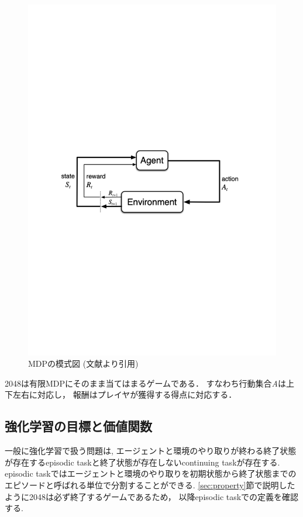 \begin{figure}[h]
  \centering
  \includegraphics[width=\linewidth{}]{figures/MDP.pdf}
  \caption{MDPの模式図 (文献\cite{Sutton1998}より引用) \label{fig:mdp}}
\end{figure}

2048は有限MDPにそのまま当てはまるゲームである．
すなわち行動集合\textit{A}は上下左右に対応し， 報酬はプレイヤが獲得する得点に対応する．

\subsection{強化学習の目標と価値関数}
一般に強化学習で扱う問題は, エージェントと環境のやり取りが終わる終了状態が存在するepisodic taskと終了状態が存在しないcontinuing taskが存在する. 
episodic taskではエージェントと環境のやり取りを初期状態から終了状態までのエピソードと呼ばれる単位で分割することができる.
\ref{sec:property}節で説明したように2048は必ず終了するゲームであるため， 以降episodic taskでの定義を確認する. 

